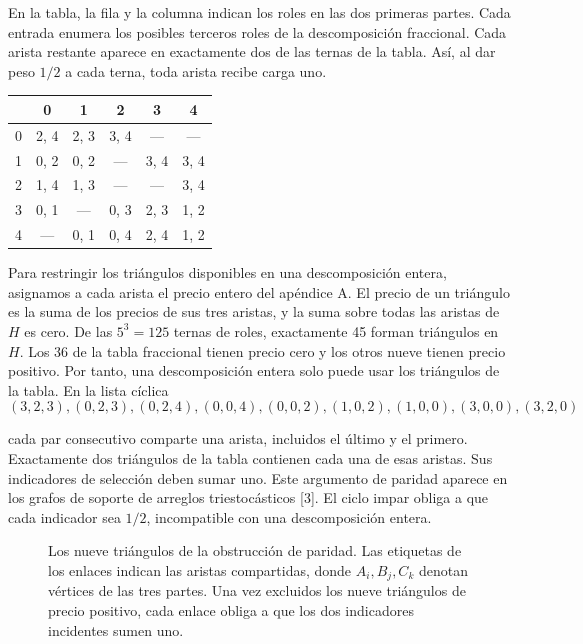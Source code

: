 \documentclass[spanish,11pt,a4paper]{article}
\begin{document}
En la tabla, la fila y la columna indican los roles en las dos primeras partes. Cada entrada enumera los posibles terceros roles de la descomposición fraccional. Cada arista restante aparece en exactamente dos de las ternas de la tabla. Así, al dar peso \(1/2\) a cada terna, toda arista recibe carga uno.

\begin{center}
\begin{tabular}{cccccc}
\toprule
 & 0 & 1 & 2 & 3 & 4 \\
\midrule
0 & 2, 4 & 2, 3 & 3, 4 & — & — \\
1 & 0, 2 & 0, 2 & — & 3, 4 & 3, 4 \\
2 & 1, 4 & 1, 3 & — & — & 3, 4 \\
3 & 0, 1 & — & 0, 3 & 2, 3 & 1, 2 \\
4 & — & 0, 1 & 0, 4 & 2, 4 & 1, 2 \\
\bottomrule
\end{tabular}
\end{center}

Para restringir los triángulos disponibles en una descomposición entera, asignamos a cada arista el precio entero del apéndice A. El precio de un triángulo es la suma de los precios de sus tres aristas, y la suma sobre todas las aristas de \(H\) es cero. De las \(5^3=125\) ternas de roles, exactamente 45 forman triángulos en \(H\). Los 36 de la tabla fraccional tienen precio cero y los otros nueve tienen precio positivo. Por tanto, una descomposición entera solo puede usar los triángulos de la tabla. En la lista cíclica
\[(3,2,3),(0,2,3),(0,2,4),(0,0,4),(0,0,2),
(1,0,2),(1,0,0),(3,0,0),(3,2,0)\]

cada par consecutivo comparte una arista, incluidos el último y el primero. Exactamente dos triángulos de la tabla contienen cada una de esas aristas. Sus indicadores de selección deben sumar uno. Este argumento de paridad aparece en los grafos de soporte de arreglos triestocásticos {[}3{]}. El ciclo impar obliga a que cada indicador sea \(1/2\), incompatible con una descomposición entera.

\begin{figure}[htbp]
\centering
\caption{Los nueve triángulos de la obstrucción de paridad. Las etiquetas de los enlaces indican las aristas compartidas, donde $A_i,B_j,C_k$ denotan vértices de las tres partes. Una vez excluidos los nueve triángulos de precio positivo, cada enlace obliga a que los dos indicadores incidentes sumen uno.}\label{fig:odd-cycle}
\end{figure}
\end{document}
